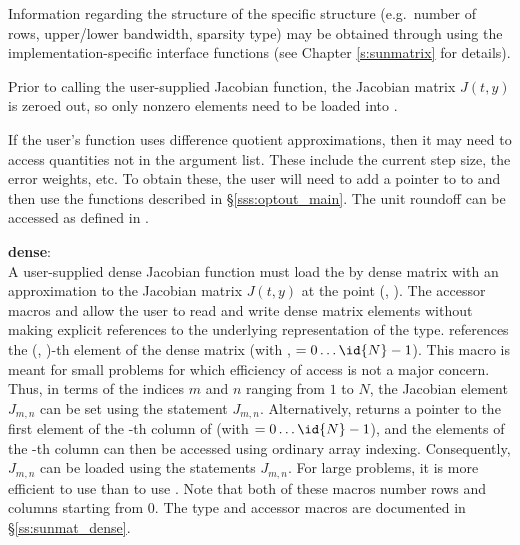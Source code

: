 {
  Information regarding the structure of the specific {\sunmatrix}
  structure (e.g.~number of rows, upper/lower bandwidth, sparsity
  type) may be obtained through using the implementation-specific
  {\sunmatrix} interface functions (see Chapter \ref{s:sunmatrix} for
  details).

  Prior to calling the user-supplied Jacobian function, the Jacobian
  matrix $J(t,y)$ is zeroed out, so only nonzero elements need to be
  loaded into .

  If the user's  function uses difference quotient
  approximations, then it may need to access quantities not in the
  argument list.  These include the current step size, the error
  weights, etc.  To obtain these, the user will need to add a pointer
  to  to  and then use the 
  functions described in \S\ref{sss:optout_main}. The unit roundoff
  can be accessed as  defined in
  . 

  {\bf dense}:\\
  A user-supplied dense Jacobian function must load the  by 
  dense matrix  with an approximation to the Jacobian matrix $J(t,y)$
  at the point (, ).  The accessor macros 
  and  allow the user to read and write dense matrix
  elements without making explicit references to the underlying
  representation of the {\sunmatdense} type.
   references the (, )-th
  element of the dense matrix  (with , $= 0\ldots
  \id{N}-1$). This macro is meant for small problems for which efficiency
  of access is not a major concern.  Thus, in terms of the indices $m$
  and $n$ ranging from $1$ to $N$, the Jacobian element $J_{m,n}$ can
  be set using the statement 
  $J_{m,n}$.  Alternatively,  returns a
  pointer to the first element of the -th column of 
  (with $= 0\ldots \id{N}-1$), and the elements of the -th column
  can then be accessed using ordinary array indexing.  Consequently,
  $J_{m,n}$ can be loaded using the statements
    $J_{m,n}$.
  For large problems, it is more efficient to use 
  than to use .  Note that both of these macros
  number rows and columns starting from $0$.  The {\sunmatdense} type
  and accessor macros are documented in \S\ref{ss:sunmat_dense}.

}
